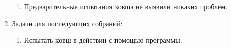 \begin{enumerate}
\begin{enumerate}
		\item Предварительные испытания ковша не выявили никаких проблем.
		
	\end{enumerate}
	
	\item Задачи для последующих собраний:
	\begin{enumerate}
		\item Испытать ковш в действии с помощью программы.
		
	\end{enumerate}     
\end{enumerate}
\fillpage

